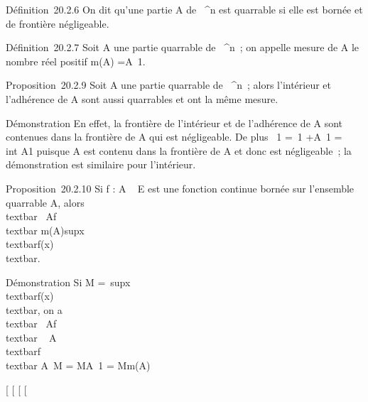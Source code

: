 Définition~20.2.6 On dit qu'une partie A de ~^n est quarrable
si elle est bornée et de frontière négligeable.

Définition~20.2.7 Soit A une partie quarrable de ~^n~; on
appelle mesure de A le nombre réel positif m(A)
=\int  A~1.

Proposition~20.2.9 Soit A une partie quarrable de ~^n~; alors
l'intérieur et l'adhérence de A sont aussi quarrables et ont la même
mesure.

Démonstration En effet, la frontière de l'intérieur et de l'adhérence de
A sont contenues dans la frontière de A qui est négligeable. De plus
\int  \overlineA~1
=\int  \overlineA\diagdownA~1
+\int  A~1 =\\int
 A1 puisque \overlineA \diagdown A est contenu dans
la frontière de A et donc est négligeable~; la démonstration est
similaire pour l'intérieur.

Proposition~20.2.10 Si f : A \rightarrow~ E est une fonction continue bornée sur
l'ensemble quarrable A, alors
\\textbar{}\int ~
Af\\textbar{} \leq
m(A)supx\inA~\\textbar{}f(x)\\textbar{}.

Démonstration Si M =\
supx\inA\\textbar{}f(x)\\textbar{},
on a \\textbar{}\int ~
Af\\textbar{} \leq\int ~
A\\textbar{}f\\textbar{}
\leq\int  A~M =
M\int  A~1 = Mm(A)

{[}
{[}
{[}
{[}
